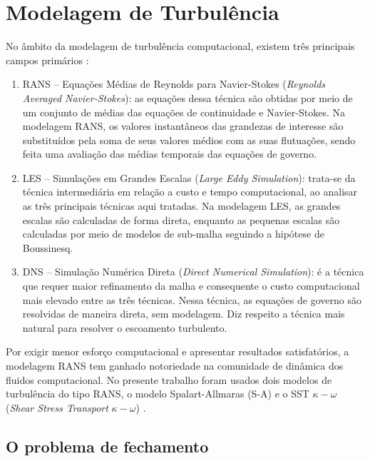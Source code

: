 \chapter{Modelagem de Turbulência}\label{cap:turbulencia}
\graphicspath{{chapter-04/img-cap04/}}

No âmbito da modelagem de turbulência computacional, existem três principais campos primários \cite{Rezende2009}:

\begin{enumerate}

    \item RANS – Equações Médias de Reynolds para Navier-Stokes (\textit{Reynolds Averaged Navier-Stokes}): as equações dessa técnica são obtidas por meio de um conjunto de médias das equações de continuidade e Navier-Stokes. Na modelagem RANS, os valores instantâneos das grandezas de interesse são substituídos pela soma de seus valores médios com as suas flutuações, sendo feita uma avaliação das médias temporais das equações de governo. 

    \item LES – Simulações em Grandes Escalas (\textit{Large Eddy Simulation}): trata-se da técnica intermediária em relação a custo e tempo computacional, ao analisar as três principais técnicas aqui tratadas. Na modelagem LES, as grandes escalas são calculadas de forma direta, enquanto as pequenas escalas são calculadas por meio de modelos de sub-malha seguindo a hipótese de Boussinesq.

    \item DNS – Simulação Numérica Direta (\textit{Direct Numerical Simulation}): é a técnica que requer maior refinamento da malha e consequente o custo computacional mais elevado entre as três técnicas. Nessa técnica, as equações de governo são resolvidas de maneira direta, sem modelagem. Diz respeito a técnica mais natural para resolver o escoamento turbulento. 
 
\end{enumerate}

Por exigir menor esforço computacional e apresentar resultados satisfatórios, a modelagem RANS tem ganhado notoriedade na comunidade de dinâmica dos fluidos computacional. No presente trabalho foram usados dois modelos de turbulência do tipo RANS, o modelo Spalart-Allmaras (S-A) \cite{Spalart1992} e o SST $\kappa-\omega$ (\textit{Shear Stress Transport} $\kappa-\omega$) \cite{Menter1994TwoequationET}. 

\section{O problema de fechamento}

